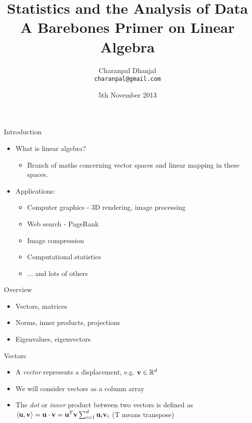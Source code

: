 \documentclass{beamer}
\title{Statistics and the Analysis of Data\\ A Barebones Primer on Linear Algebra}
\author{Charanpal Dhanjal \\ \texttt{charanpal@gmail.com}}
\institute{\'{E}cole des Ponts}
\date{5th November 2013}
\begin{document}
\frame{\titlepage}

\begin{frame}{Introduction}
\begin{itemize} 
 \item What is linear algebra? 
 \begin{itemize}
 \item Branch of maths concerning vector spaces and linear mapping in these spaces. 
 \end{itemize} 
 \item Applications: 
 \begin{itemize}
 \item Computer graphics - 3D rendering, image processing  
 \item Web search - PageRank
 \item Image compression 
 \item Computational statistics 
 \item ... and lots of others 
 \end{itemize} 
\end{itemize}
\end{frame}

\begin{frame}{Overview} 
\begin{itemize}
 \item Vectors, matrices 
 \item Norms, inner products, projections  
 \item Eigenvalues, eigenvectors 
\end{itemize} 
\end{frame}

\begin{frame}{Vectors}
\begin{itemize} 
 \item A \emph{vector} represents a displacement, e.g. $\textbf{v} \in \mathbb{R}^d$ 
 \item We will consider vectors as a column array 
 \item The \emph{dot} or \emph{inner} product between two vectors is defined as $\langle \textbf{u}, \textbf{v} \rangle = \textbf{u} \cdot \textbf{v} = \textbf{u}^T\textbf{v} \sum_{i=1}^d \textbf{u}_i\textbf{v}_i$ (T means transpose)
 
\end{itemize}
\end{frame}
\end{document}

